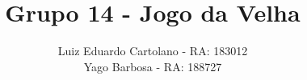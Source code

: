\author{Luiz Eduardo Cartolano - RA: 183012 \\ Yago Barbosa - RA: 188727}
\title{Grupo 14 - Jogo da Velha}
\newcommand{\nomedocurso}{MC613 - Turma A}
\newcommand{\orientador}{Prof. Dr. Sandro Rigo \\ Isaías Felzmann}
